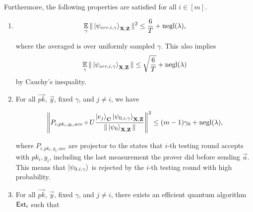 \begin{lemma}
	Furthermore, the following properties are satisfied for all $i\in[m]$.
	\begin{enumerate}
		\item \label{property:partition-err}  $$\operatorname*{\mathbb{E}}_{\gamma}\|\ket{\psi_{err,i,\gamma}}_{\mathbf{X},\mathbf{Z}}\|^2 \leq \frac{6}{T}+\operatorname{negl}(\lambda),$$

			where the averaged is over uniformly sampled $\gamma$. This also implies
			\begin{align}
				\operatorname*{\mathbb{E}}_{\gamma}\|\ket{\psi_{err,i,\gamma}}_{\mathbf{X},\mathbf{Z}}\| \leq \sqrt{\frac{6}{T}}+\operatorname{negl}(\lambda)
			\end{align}
			by Cauchy's inequality.

		\item \label{property:partition-testing}
			For all $\vec{pk}$, $\vec{y}$, fixed $\gamma$, and  $j\neq i$, we have


			\begin{align}
				\left\lVert P_{i,pk_i,y_i,acc} \circ U\frac{\ket{e_j}_{\mathbf{C}}\ket{\psi_{0,i,\gamma}}_{\mathbf{X},\mathbf{Z}}}{\|\ket{\psi_0}_{\mathbf{X},\mathbf{Z}}\|}\right\rVert^2 \leq (m-1)\gamma_0+\operatorname{negl}(\lambda),
			\end{align}


			where $P_{i,pk_i,y_i,acc}$ are projector to the states that $i$-th testing round accepts with $pk_i,y_i$, including the last measurement the prover did before sending $\vec{a}$.  This means that $\ket{\psi_{0,i,\gamma}}$ is rejected by the $i$-th testing round with high probability.


		\item \label{property:partition-binding}

			For all $\vec{pk}$, $\vec{y}$, fixed $\gamma$, and $j\neq i$, there exists an efficient quantum algorithm $\mathsf{Ext}_i$ such that


\end{enumerate}
\end{lemma}
